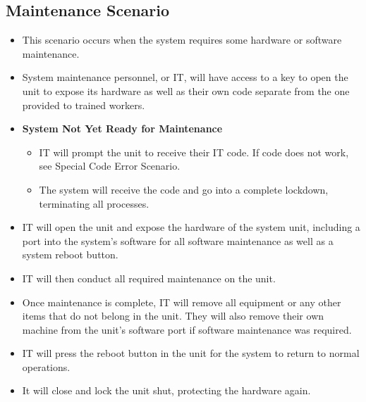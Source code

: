 \subsection{Maintenance Scenario}
\begin{itemize}
    \item This scenario occurs when the system requires some hardware or 
    software maintenance.
    \item System maintenance personnel, or IT, will have access to a key to 
    open the unit to expose its hardware as well as their own code separate 
    from the one provided to trained workers.
    \item \textbf{System Not Yet Ready for Maintenance}
    \begin{itemize}
        \item IT will prompt the unit to receive their IT code. If code does 
        not work, see Special Code Error Scenario.
        \item The system will receive the code and go into a complete 
        lockdown, terminating all processes.
    \end{itemize}
    \item IT will open the unit and expose the hardware of the system unit, 
    including a port into the system’s software for all software maintenance 
    as well as a system reboot button.
    \item IT will then conduct all required maintenance on the unit.
    \item Once maintenance is complete, IT will remove all equipment or any 
    other items that do not belong in the unit. They will also remove their own 
    machine from the unit’s software port if software maintenance was required.
    \item IT will press the reboot button in the unit for the system to return 
    to normal operations.
    \item It will close and lock the unit shut, protecting the hardware again.
\end{itemize}

